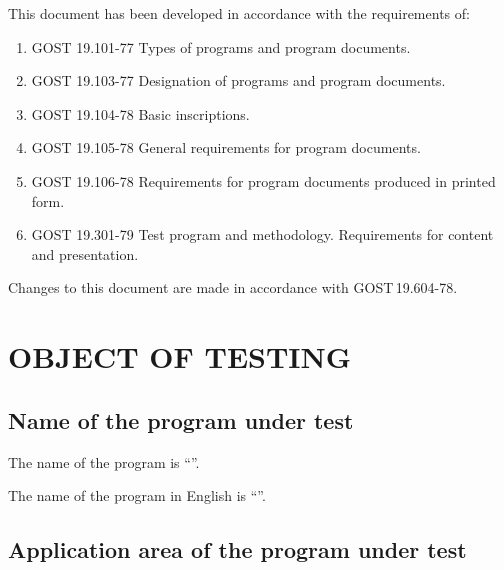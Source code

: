 \documentclass[12pt,a4paper]{extarticle}
\begin{document}
\noindent
This document has been developed in accordance with the requirements of:

\begin{enumerate}[label=\arabic*), leftmargin=1.25cm]
\item GOST 19.101-77 Types of programs and program documents\cite{gost19101}.
\item GOST 19.103-77 Designation of programs and program documents\cite{gost19103}.
\item GOST 19.104-78 Basic inscriptions\cite{gost19104}.
\item GOST 19.105-78 General requirements for program documents\cite{gost19105}.
\item GOST 19.106-78 Requirements for program documents produced in
      printed form\cite{gost19106}.
\item GOST 19.301-79 Test program and methodology. Requirements for
      content and presentation\cite{gost19301}.
\end{enumerate}

Changes to this document are made in accordance with GOST\,19.604-78\cite{gost19604}.

\clearpage

\hypersetup{linkcolor=black}
\tableofcontents
\hypersetup{linkcolor=blue}
\thispagestyle{fancy}
\clearpage

\section{OBJECT OF TESTING}

\subsection{Name of the program under test}

The name of the program is \enquote{\projectname}.

The name of the program in English is \enquote{\hseProjectNameEn}.

\subsection{Application area of the program under test}
\end{document}
